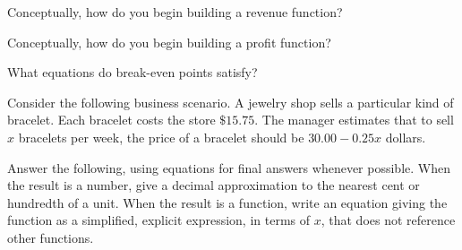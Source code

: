 \begin{ProblemSet}
 \begin{Problem}
  Conceptually, how do you begin building a revenue function?
 \end{Problem}
 \begin{Problem}
  Conceptually, how do you begin building a profit function?
 \end{Problem}
 \begin{Problem}
  What equations do break-even points satisfy?
 \end{Problem}
\end{ProblemSet}

\newpage

Consider the following business scenario.
A jewelry shop sells a particular kind of bracelet.
Each bracelet costs the store $\$15.75$.
The manager estimates that to sell $x$ bracelets per week, the price of a bracelet should be $30.00 - 0.25 x$ dollars.

Answer the following, using equations for final answers whenever possible.
When the result is a number, give a decimal approximation to the nearest cent or hundredth of a unit.
When the result is a function, write an equation giving the function as a simplified, explicit expression, in terms of $x$, that does not reference other functions.

